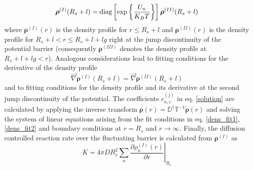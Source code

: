 \documentclass[twocolumn,superscriptaddress]{revtex4}
\newcommand{\vect}[1]{\boldsymbol{\mathbf{#1}}}
\begin{document}
\begin{equation}
    \vect{\rho}^{(I)}(R_s+l) = {\rm diag}\left[\exp\left\{\frac{U_n}{K_B T} \right\}\right]\vect{\rho}^{(II)}(R_s+l)
    \label{dens_fit1}
\end{equation}
where $\vect{\rho}^{(I)}(r)$ is the density profile for $r \le R_s+l$ and $\vect{\rho}^{(II)}(r)$ is the density profile for $ R_s+l<r\le R_s+l+lg$ right at the jump discontinuity of the potential barrier (consequently $\vect{\rho}^{(III)}$ denotes the density profile at $R_s+l+lg<r$). Analogous considerations lead to fitting conditions for the derivative of the density profile
\begin{equation}
    \vec{\nabla}\vect{\rho}^{(I)}(R_s+l) =\vec{\nabla}\vect{\rho}^{(II)}(R_s+l) 
    \label{dens_fit2}
\end{equation}
and to fitting conditions for the density profile and its derivative at the second jump discontinuity of the potential.
The coefficients $c_{n,i}^{(j)}$ in eq. \eqref{solution} are calculated by applying the inverse transform $\vect{\rho}(r) = \mathbb{D}^{\dagger}\mathbb{T}^{-1}\tilde{\vect{\rho}}(r)$ and solving the system of linear equations arising from the fit conditions in eq. \eqref{dens_fit1}, \eqref{dens_fit2} and boundary conditions at $r=R_s$ and $r \rightarrow \infty$. Finally, the diffusion controlled reaction rate over the fluctuating barrier is calculated from $\vect{\rho}^{(I)}$ as
\begin{equation}
    K = 4 \pi D R_s^{2}\sum_n \left. \frac{\partial \rho_n^{(I)}(r)}{\partial r} \right|_{R_s}
    \label{rate_konstant}
\end{equation}
\end{document}
